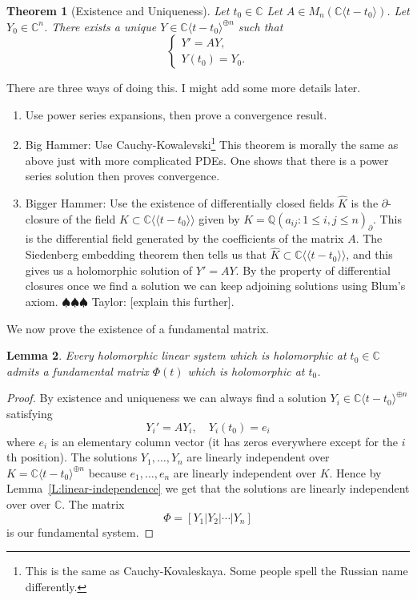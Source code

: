 \documentclass[12pt]{book}
\newcommand{\taylor}[1]{{\color{blue} \sf $\spadesuit\spadesuit\spadesuit$ Taylor: [#1]}}
\numberwithin{equation}{section}
\newtheorem{theorem}{Theorem}[subsection]
\newtheorem{lemma}[theorem]{Lemma}
\theoremstyle{definition}
\theoremstyle{remark}
\newcommand{\QQ}{\mathbb{Q}}
\newcommand{\CC}{\mathbb{C}}
\newcommand{\llangle}{\langle \langle}
\newcommand{\rrangle}{\rangle \rangle}
\begin{document}
 \begin{theorem}[Existence and Uniqueness]
Let $t_0 \in \CC$
Let $A \in M_n(\CC\langle t-t_0 \rangle)$. 
Let $Y_0 \in \CC^n$. 
There exists a unique $Y \in \CC\langle t-t_0 \rangle^{\oplus n}$ such that 
$$\begin{cases}
	Y' = A Y,\\
	Y(t_0) = Y_0.
\end{cases}$$
 \end{theorem}
 There are three ways of doing this.
 I might add some more details later.
 \begin{enumerate}
 	\item Use power series expansions, then prove a convergence result. 
 	\item Big Hammer: Use Cauchy-Kowalevski\footnote{This is the same as Cauchy-Kovaleskaya.
 	Some people spell the Russian name differently. }
   This theorem is morally the same as above just with more complicated PDEs. 
   One shows that there is a power series solution then proves convergence.
    \item Bigger Hammer: Use the existence of differentially closed fields $\widehat{K}$ is the $\partial$-closure of the field $K \subset \CC\llangle t-t_0 \rrangle$ given by $K=\QQ(a_{ij} : 1\leq i,j \leq n )_{\partial}$.
    This is the differential field generated by the coefficients of the matrix $A$.
    The Siedenberg embedding theorem then tells us that $\widehat{K} \subset \CC\llangle t-t_0 \rrangle$, and this gives us a holomorphic solution of $Y'=AY$. 
    By the property of differential closures once we find a solution we can keep adjoining solutions using Blum's axiom. \taylor{explain this further}.
 \end{enumerate}

We now prove the existence of a fundamental matrix.
\begin{lemma}
	Every holomorphic linear system which is holomorphic at $t_0 \in \CC$ admits a fundamental matrix $\Phi(t)$ which is holomorphic at $t_0$.
\end{lemma}
\begin{proof}
By existence and uniqueness we can always find a solution $Y_i \in \CC\langle t-t_0 \rangle^{\oplus n}$ satisfying 
 $$ Y_i' = AY_i, \quad Y_i(t_0) = e_i $$
where $e_i$ is an elementary column vector (it has zeros everywhere except for the $i$th position).
The solutions $Y_1,\ldots,Y_n$ are linearly independent over $K=\CC\langle t-t_0 \rangle^{\oplus n}$ because $e_1,\ldots,e_n$ are linearly independent over $K$. 
Hence by Lemma~\ref{L:linear-independence} we get that the solutions are linearly independent over over $\CC$.
 The matrix $$\Phi = [Y_1 \vert Y_2 \vert \cdots \vert Y_n ]$$ 
 is our fundamental system.
 \end{proof}
\end{document}
